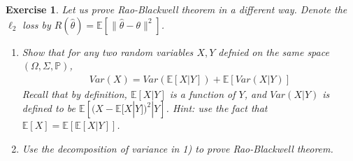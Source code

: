 \documentclass[12pt]{article}
\theoremstyle{colon}
\newtheorem{exercise}{Exercise}
\begin{document}
\begin{exercise}
  Let us prove Rao-Blackwell theorem in a different way. Denote the $\ell_2$ loss by $R(\widehat{\theta}) = \mathbb{E}[\lVert \widehat{\theta} - \theta \rVert^2]$.
  \begin{enumerate}[label=\arabic*)]
    \item Show that for any two random variables $X, Y$ defnied on the same space $(\Omega, \Sigma, \mathbb{P})$,
      \begin{gather*}
        Var(X) = Var(\mathbb{E}[X|Y]) + \mathbb{E}[Var(X|Y)]
      \end{gather*}
      Recall that by definition, $\mathbb{E}[X|Y]$ is a function of $Y$, and $Var(X|Y)$ is defined to be $\mathbb{E} \left[ (X - \mathbb{E}[X|Y])^2 |Y \right]$. Hint: use the fact that $\mathbb{E}[X] = \mathbb{E}[\mathbb{E}[X|Y]]$.

    \item Use the decomposition of variance in 1) to prove Rao-Blackwell theorem.
  \end{enumerate}
\end{exercise}
\end{document}
